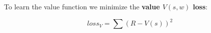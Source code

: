 To learn the value function we minimize the \textbf{value $V(s, w)$ loss}:

\begin{equation}
	loss_V = \sum(R - V(s))^2
\end{equation}



		

